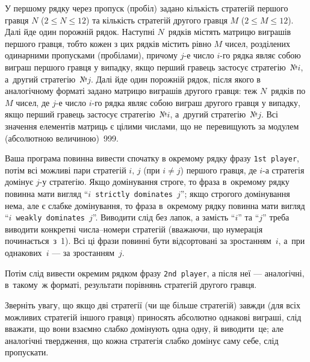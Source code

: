 \InputFile

У першому рядку через пропуск (пробіл) задано кількість стратегій першого гравця $N$ ($2\leqslant N\leqslant 12$) та кількість стратегій другого гравця $M$ ($2\leqslant M\leqslant 12$).
Далі йде один порожній рядок.
Наступні $N$~рядків містять матрицю виграшів першого гравця, тобто кожен з цих рядків містить рівно $M$ чисел, розділених одинарними пропусками (пробілами), причому $j$-е число $i$-го рядка являє собою виграш першого гравця у випадку, якщо перший гравець застосує стратегію~№$i$, а~другий стратегію~№$j$. Далі йде один порожній рядок, після якого в аналогічному форматі задано матрицю виграшів другого гравця: теж $N$~рядків по $M$ чисел, де $j$-е число $i$-го рядка являє собою виграш другого гравця у випадку, якщо перший гравець застосує стратегію~№$i$, а~другий стратегію~№$j$. Всі значення елементів матриць є цілими числами, що не~перевищують за модулем (абсолютною величиною)~999.

\OutputFile
Ваша програма повинна вивести спочатку в окремому рядку фразу {\tt 1st~player}, потім всі можливі пари стратегій $i,\,j$ (при $i{\neq}j$) першого гравця, де $i$-а стратегія домінує $j$-у стратегію. Якщо домінування строге, то фраза в~окремому рядку повинна мати вигляд ``$i$~{\tt strictly dominates}~$j$''; якщо строгого домінування нема, але є слабке домінування, то фраза в~окремому рядку повинна мати вигляд ``$i$~{\tt weakly dominates}~$j$''. Виводити слід без лапок, а замість ``$i$'' та ``$j$'' треба виводити конкретні числа--номери стратегій (вважаючи, що нумерація починається~з~1).
Всі ці фрази повинні бути відсортовані за зростанням~$i$, а~при однакових~$i$ --- за зростанням~$j$.

Потім слід вивести окремим рядком фразу \texttt{2nd~player}, а після неї --- аналогічні, в~такому~ж форматі, результати порівнянь стратегій другого гравця.

\Examples

\begin{example}
%
\end{example}

\Note
Зверніть увагу, що якщо дві стратегії (чи ще більше стратегій) завжди (для всіх можливих стратегій іншого гравця) приносять абсолютно однакові виграші, слід вважати, що вони взаємно слабко домінують одна одну, й виводити~це; але аналогічні твердження, що кожна стратегія слабко домінує саму себе, слід пропускати.